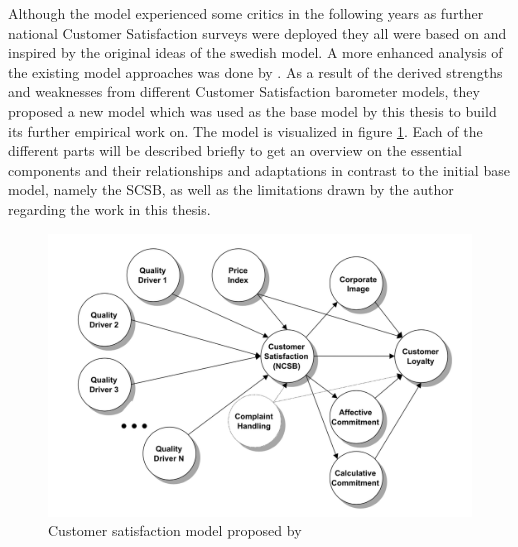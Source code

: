 Although the model experienced some critics in the following years as further national Customer Satisfaction surveys were deployed they all were based on and inspired by the original ideas of the swedish model. A more enhanced analysis of the existing model approaches was done by \cite{johnson2001evolution}. As a result of the derived strengths and weaknesses from different Customer Satisfaction barometer models, they proposed a new model which was used as the base model by this thesis to build its further empirical work on. The model is visualized in figure \ref{fig:satisfactionModel}. Each of the different parts will be described briefly to get an overview on the essential components and their relationships and adaptations in contrast to the initial base model, namely the SCSB, as well as the limitations drawn by the author regarding the work in this thesis. 

\begin{figure}
	\centering
	\includegraphics[width=1.0\textwidth]{img/custSatisfaction.png}
	\caption{Customer satisfaction model proposed by \cite{johnson2001evolution}}
	\label{fig:satisfactionModel}
\end{figure} 

